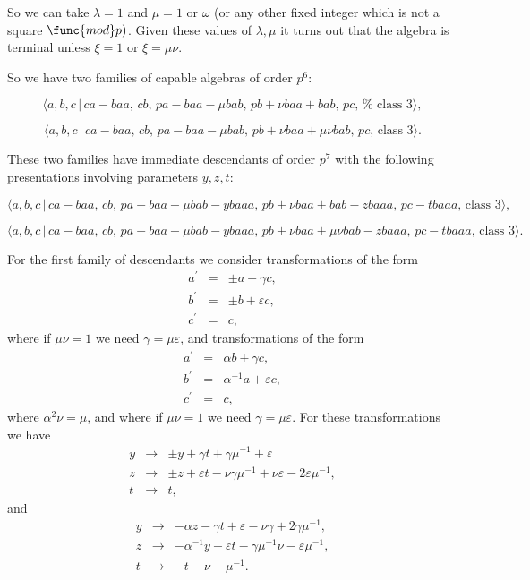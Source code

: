 \documentclass[12pt]{article}
\begin{document}
So we can take $\lambda =1$ and $\mu =1$ or $\omega $ (or any other fixed
integer which is not a square $\func{mod}p)$. Given these values of $\lambda
,\mu $ it turns out that the algebra is terminal unless $\xi =1$ or $\xi
=\mu \nu $.

So we have two families of capable algebras of order $p^{6}$:

\[
\langle a,b,c\,|\,ca-baa,\,cb,\,pa-baa-\mu bab,\,pb+\nu baa+bab,\,pc,\,\text{%
class }3\rangle , 
\]

\[
\langle a,b,c\,|\,ca-baa,\,cb,\,pa-baa-\mu bab,\,pb+\nu baa+\mu \nu
bab,\,pc,\,\text{class }3\rangle . 
\]

These two families have immediate descendants of order $p^{7}$ with the
following presentations involving parameters $y,z,t$:

\[
\langle a,b,c\,|\,ca-baa,\,cb,\,pa-baa-\mu bab-ybaaa,\,pb+\nu
baa+bab-zbaaa,\,pc-tbaaa,\,\text{class }3\rangle , 
\]

\[
\langle a,b,c\,|\,ca-baa,\,cb,\,pa-baa-\mu bab-ybaaa,\,pb+\nu baa+\mu \nu
bab-zbaaa,\,pc-tbaaa,\,\text{class }3\rangle . 
\]

For the first family of descendants we consider transformations of the form%
\begin{eqnarray*}
a^{\prime } &=&\pm a+\gamma c, \\
b^{\prime } &=&\pm b+\varepsilon c, \\
c^{\prime } &=&c,
\end{eqnarray*}%
where if $\mu \nu =1$ we need $\gamma =\mu \varepsilon $, and
transformations of the form 
\begin{eqnarray*}
a^{\prime } &=&\alpha b+\gamma c, \\
b^{\prime } &=&\alpha ^{-1}a+\varepsilon c, \\
c^{\prime } &=&c,
\end{eqnarray*}%
where $\alpha ^{2}\nu =\mu $, and where if $\mu \nu =1$ we need $\gamma =\mu
\varepsilon $. For these transformations we have%
\begin{eqnarray*}
y &\rightarrow &\pm y+\gamma t+\gamma \mu ^{-1}+\varepsilon  \\
z &\rightarrow &\pm z+\varepsilon t-\nu \gamma \mu ^{-1}+\nu \varepsilon
-2\varepsilon \mu ^{-1}, \\
t &\rightarrow &t,
\end{eqnarray*}%
and%
\begin{eqnarray*}
y &\rightarrow &-\alpha z-\gamma t+\varepsilon -\nu \gamma +2\gamma \mu
^{-1}, \\
z &\rightarrow &-\alpha ^{-1}y-\varepsilon t-\gamma \mu ^{-1}\nu
-\varepsilon \mu ^{-1}, \\
t &\rightarrow &-t-\nu +\mu ^{-1}.
\end{eqnarray*}
\end{document}
